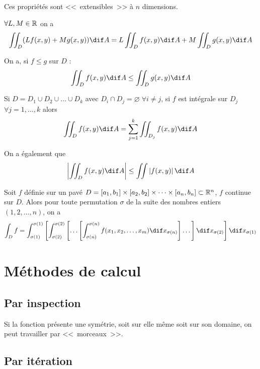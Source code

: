 \begin{myrem}
	Ces propriétés sont <<~extensibles~>> à $n$ dimensions.
\end{myrem}

\begin{myform}
	$\forall L, M \in \mathbb{R}$ on a
	\[ \iint_D (L f(x,y) + M g(x,y)) \dif A = L \iint_D f(x,y) \dif A + M \iint_D g(x,y) \dif A \]
\end{myform}

\begin{myform} On a, si $f \leq g$ sur $D$ :
	\[ \iint_D f(x,y) \dif A \leq \iint_D g(x,y) \dif A \]

	Si $D = D_1 \cup D_2 \cup \dots \cup D_k$ avec $D_i \cap D_j = \varnothing \; \forall i \neq j$, si $f$ est intégrale sur $D_j$ $\forall j = 1, \dots, k$ alors
	\[ \iint_D f(x,y) \dif A = \sum_{j=1}^k \iint_{D_j} f(x,y) \dif A \]

	On a également que
	\[ \left| \iint_D f(x,y) \dif A \right| \leq \iint \left| f(x,y) \right| \dif A \]
\end{myform}

\begin{mytheo} Soit $f$ définie sur un pavé $D = [a_1,b_1] \times [a_2,b_2] \times \cdots \times [a_n,b_n] \subset \mathbb{R}^n$, $f$ continue sur $D$. Alors pour toute permutation $\sigma$ de la suite des nombres entiers $(1,2,\dots, n)$, on a
	\[ \int_D f = \int_{\sigma(1)}^{\sigma(1)} \left[ \int_{\sigma(2)}^{\sigma(2)}   \left[ \dots \left[ \int_{\sigma(n)}^{\sigma(n)} f(x_1,x_2,\dots,x_m) \dif x_{\sigma(n)} \right]   \dots \right] \dif x_{\sigma(2)} \right] \dif x_{\sigma(1)} \]
\end{mytheo}

\section{Méthodes de calcul}

\subsection{Par inspection} Si la fonction présente une symétrie, soit sur elle même soit sur son domaine, on peut travailler par <<~morceaux~>>.

\subsection{Par itération}

